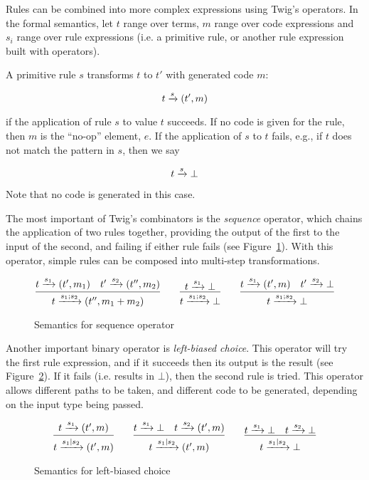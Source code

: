 Rules can be combined into more complex expressions using Twig's operators. In
the formal semantics, let $t$ range over terms, $m$ range over code
expressions and $s_i$ range over rule expressions (i.e. a primitive rule, or
another rule expression built with operators).

A primitive rule $s$ transforms $t$ to $t'$ with generated code $m$:

\[
t \xrightarrow{s} (t',m)
\]

if the application of rule $s$ to value $t$ succeeds. If no code is given for
the rule, then $m$ is the ``no-op'' element, $e$. If the application of $s$ to
$t$ fails, e.g., if $t$ does not match the pattern in $s$, then we say

\[
t \xrightarrow{s} \bot
\]

Note that no code is generated in this case.

The most important of Twig's combinators is the \emph{sequence} operator,
which chains the application of two rules together, providing the output of
the first to the input of the second, and failing if either rule fails (see
Figure~\ref{semantics:sequence}). With this operator, simple rules can be
composed into multi-step transformations.

\begin{figure}[ht]
\label{semantics:sequence}
\[
\infer{t \arr{s_1;s_2} (t'',m_1+m_2)}{t \arr{s_1} (t',m_1) \quad t' \arr{s_2} (t'',m_2)}
\qquad 
\infer{t \arr{s_1;s_2} \bot}{t \arr{s_1} \bot}
\qquad
\infer{t \arr{s_1;s_2} \bot}{t \arr{s_1} (t',m) \quad t' \arr{s_2} \bot}
\]
\caption{Semantics for sequence operator}
\end{figure}

Another important binary operator is \emph{left-biased choice}. This operator
will try the first rule expression, and if it succeeds then its output is the
result (see Figure~\ref{semantics:choice}). If it fails (i.e. results in
$\bot$), then the second rule is tried. This operator allows different paths
to be taken, and different code to be generated, depending on the input type
being passed.

\begin{figure}[ht]
\label{semantics:choice}
\[
\infer{t \arr{s_1|s_2} (t',m)}{t \arr{s_1} (t',m)}
\qquad 
\infer{t \arr{s_1|s_2} (t',m)}{t \arr{s_1} \bot \quad t \arr{s_2} (t',m)}
\qquad
\infer{t \arr{s_1|s_2} \bot}{t \arr{s_1} \bot \quad t \arr{s_2} \bot}
\]
\caption{Semantics for left-biased choice}
\end{figure}

